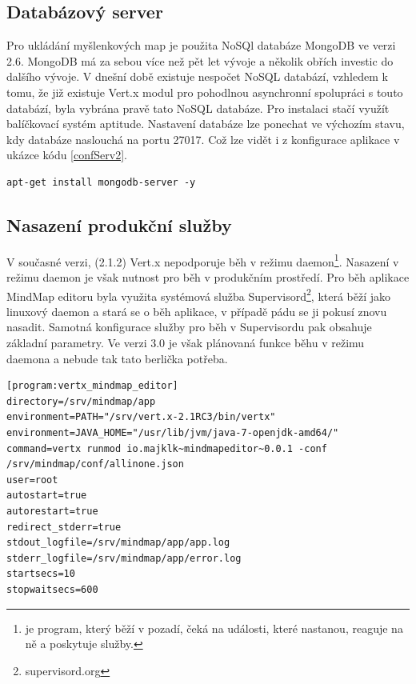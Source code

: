 \subsection{Databázový server}

Pro ukládání myšlenkových map je použita NoSQl databáze MongoDB ve verzi 2.6. MongoDB má za sebou více než pět let vývoje a několik obřích investic\cite{mongodb} do dalšího vývoje. V dnešní době existuje nespočet NoSQL databází, vzhledem k tomu, že již existuje Vert.x modul pro pohodlnou asynchronní spolupráci s touto databází, byla vybrána pravě tato NoSQL databáze. Pro instalaci stačí využít balíčkovací systém aptitude. Nastavení databáze lze ponechat ve výchozím stavu, kdy databáze naslouchá na portu 27017. Což lze vidět i z konfigurace aplikace v ukázce kódu \ref{confServ2}.

\begin{lstlisting}
apt-get install mongodb-server -y
\end{lstlisting}

\subsection{Nasazení produkční služby}\label{sub:service}

V současné verzi, (2.1.2) Vert.x nepodporuje běh v režimu daemon\footnote{je program, který běží v pozadí, čeká na události, které nastanou, reaguje na ně a poskytuje služby.}. Nasazení v režimu daemon je však nutnost pro běh v produkčním prostředí. Pro běh aplikace MindMap editoru byla využita systémová služba Supervisord\footnote{supervisord.org}, která běží jako linuxový daemon a stará se o běh aplikace, v případě pádu se ji pokusí znovu nasadit. Samotná konfigurace služby pro běh v Supervisordu pak obsahuje základní parametry. Ve verzi 3.0 je však plánovaná funkce běhu v režimu daemona a nebude tak tato berlička potřeba.

\begin{lstlisting}[caption=Konfigurace produkční služby]
[program:vertx_mindmap_editor]
directory=/srv/mindmap/app
environment=PATH="/srv/vert.x-2.1RC3/bin/vertx"
environment=JAVA_HOME="/usr/lib/jvm/java-7-openjdk-amd64/"
command=vertx runmod io.majklk~mindmapeditor~0.0.1 -conf /srv/mindmap/conf/allinone.json
user=root
autostart=true
autorestart=true
redirect_stderr=true
stdout_logfile=/srv/mindmap/app/app.log
stderr_logfile=/srv/mindmap/app/error.log
startsecs=10
stopwaitsecs=600
\end{lstlisting}

